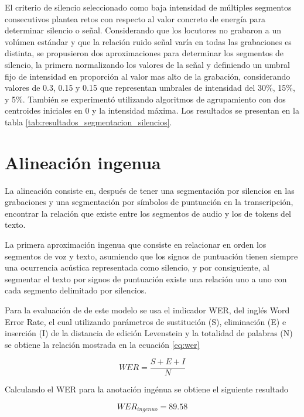 El criterio de silencio seleccionado como baja intensidad de múltiples segmentos consecutivos plantea retos con respecto al valor concreto de energía para determinar silencio o señal. Considerando que los locutores no grabaron a un volúmen estándar y que la relación ruido señal varía en todas las grabaciones es distinta, se propusieron dos aproximaciones para determinar los segmentos de silencio, la primera normalizando los valores de la señal y definiendo un umbral fijo de intensidad en proporción al valor mas alto de la grabación, considerando valores de 0.3, 0.15 y 0.15 que representan umbrales de intensidad del 30\%, 15\%, y 5\%. También se experimentó utilizando algoritmos de agrupamiento con dos centroides iniciales en 0 y la intensidad máxima. Los resultados se presentan en la tabla \ref{tab:resultados_segmentacion_silencios}.




\section{Alineación ingenua}

La alineación consiste en, después de tener una segmentación por silencios en las grabaciones y una segmentación por símbolos de puntuación en la transcripción, encontrar la relación que existe entre los segmentos de audio y los de tokens del texto.

La primera aproximación ingenua que consiste en relacionar en orden los segmentos de voz y texto, asumiendo que los signos de puntuación tienen siempre una ocurrencia acústica representada como silencio, y por consiguiente, al segmentar el texto por signos de puntuación existe una relación uno a uno con cada segmento delimitado por silencios.

Para la evaluación de de este modelo se usa el indicador WER, del inglés Word Error Rate, el cual utilizando parámetros de sustitución (S), eliminación (E) e inserción (I) de la distancia de edición Levenstein \cite{Levenshtein_SPD66} y la totalidad de palabras (N) se obtiene la relación mostrada en la ecuación \ref{eq:wer}

\begin{equation}
    \label{eq:wer}
    WER = \frac{S + E + I}{N}
\end{equation}

Calculando el WER para la anotación ingénua se obtiene el siguiente resultado


\begin{equation}
    WER_{ingenuo} = 89.58
\end{equation}
